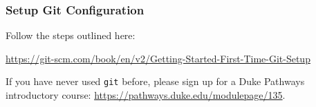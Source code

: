 \documentclass[10pt]{report}
\begin{document}
\subsubsection{Setup Git Configuration}
Follow the steps outlined here: 
\begin{center}
    \url{https://git-scm.com/book/en/v2/Getting-Started-First-Time-Git-Setup}
\end{center}

If you have never used \texttt{git} before, please sign up for a Duke Pathways
introductory course: \url{https://pathways.duke.edu/modulepage/135}.
\end{document}
